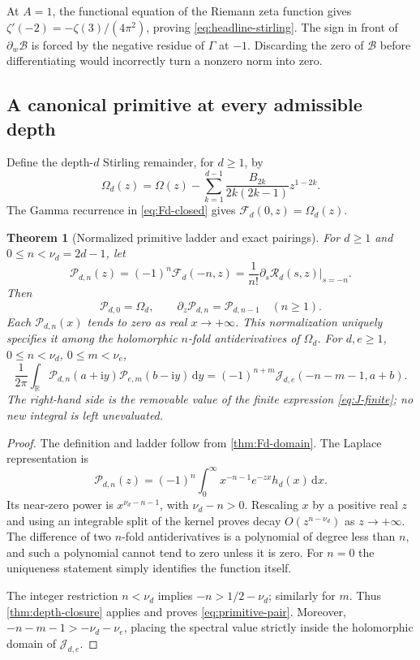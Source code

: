 \documentclass[11pt,a4paper]{article}
\newtheorem{theorem}{Theorem}[section]
\theoremstyle{definition}
\numberwithin{equation}{section}
\newcommand{\R}{\mathbb R}
\newcommand{\dd}{\,\mathrm d}
\newcommand{\ii}{\mathrm i}
\begin{document}
At $A=1$, the functional equation of the Riemann zeta function gives
$\zeta'(-2)=-\zeta(3)/(4\pi^2)$, proving
\eqref{eq:headline-stirling}. The sign in front of $\partial_w\mathcal B$
is forced by the negative residue of $\Gamma$ at $-1$.
Discarding the zero of $\mathcal B$ before differentiating would incorrectly
turn a nonzero norm into zero.

\subsection{A canonical primitive at every admissible depth}
Define the depth-$d$ Stirling remainder, for $d\ge1$, by
\begin{equation}\label{eq:Omega-depth}
 \Omega_d(z)=\Omega(z)-\sum_{k=1}^{d-1}
          \frac{B_{2k}}{2k(2k-1)}z^{1-2k}.
\end{equation}
The Gamma recurrence in \eqref{eq:Fd-closed} gives
$\mathcal F_d(0,z)=\Omega_d(z)$.

\begin{theorem}[Normalized primitive ladder and exact pairings]
\label{thm:primitive-ladder}
For $d\ge1$ and $0\le n<\nu_d=2d-1$, let
\begin{equation}\label{eq:primitive-definition}
 \mathcal P_{d,n}(z)=(-1)^n\mathcal F_d(-n,z)
      =\frac1{n!}\left.\partial_s\mathcal R_d(s,z)\right|_{s=-n}.
\end{equation}
Then
\begin{equation}\label{eq:primitive-ladder}
 \mathcal P_{d,0}=\Omega_d,\qquad
 \partial_z\mathcal P_{d,n}=\mathcal P_{d,n-1}\quad(n\ge1).
\end{equation}
Each $\mathcal P_{d,n}(x)$ tends to zero as real $x\to+\infty$.
This normalization uniquely specifies it among the holomorphic
$n$-fold antiderivatives of $\Omega_d$.
For $d,e\ge1$, $0\le n<\nu_d$, $0\le m<\nu_e$,
\begin{equation}\label{eq:primitive-pair}
 \frac1{2\pi}\int_{\R}\mathcal P_{d,n}(a+\ii y)
                       \mathcal P_{e,m}(b-\ii y)\dd y
       =(-1)^{n+m}\mathcal J_{d,e}(-n-m-1,a+b).
\end{equation}
The right-hand side is the removable value of the finite expression
\eqref{eq:J-finite}; no new integral is left unevaluated.
\end{theorem}
\begin{proof}
The definition and ladder follow from \cref{thm:Fd-domain}. The Laplace
representation is
\[
 \mathcal P_{d,n}(z)=(-1)^n\int_0^\infty x^{-n-1}e^{-zx}h_d(x)\dd x.
\]
Its near-zero power is $x^{\nu_d-n-1}$, with $\nu_d-n>0$.
Rescaling $x$ by a positive real $z$ and using an integrable split of the
kernel proves decay $O(z^{n-\nu_d})$ as $z\to+\infty$.
The difference of two $n$-fold antiderivatives is a polynomial of degree
less than $n$, and such a polynomial cannot tend to zero unless it is zero.
For $n=0$ the uniqueness statement simply identifies the function itself.

The integer restriction $n<\nu_d$ implies
$-n>1/2-\nu_d$; similarly for $m$. Thus \cref{thm:depth-closure} applies
and proves \eqref{eq:primitive-pair}. Moreover,
$-n-m-1>-\nu_d-\nu_e$, placing the spectral value strictly inside the
holomorphic domain of $\mathcal J_{d,e}$.
\end{proof}
\end{document}
